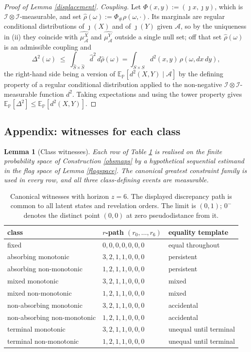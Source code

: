 \documentclass{article}
\newcommand{\E}{\mathbb{E}_{\mathbb{P}}}
\newcommand{\I}{\mathcal{I}}
\newcommand{\1}{\mathbbm{1}}
\newtheorem{lemma}{Lemma}
\begin{document}
\begin{proof}[Proof of Lemma \ref{displacement}]
\emph{Coupling.} Let $\Phi(x,y):=(\jmath x,\jmath y)$, which is $\I\otimes\I$-measurable, and set
$\hat\rho(\omega):=\Phi_{\#}\rho(\omega,\cdot)$. Its marginals are regular conditional distributions
of $\jmath(X)$ and of $\jmath(Y)$ given $\mathcal{A}$, so by the uniqueness in (ii) they coincide
with $\widehat{\mu^X_\mathcal{A}}$ and $\widehat{\mu^Y_\mathcal{A}}$ outside a single null set;
off that set $\hat\rho(\omega)$ is an admissible coupling and
\[
\Delta^2(\omega)\;\le\;\int_{\hat S\times\hat S}\hat d^2\,d\hat\rho(\omega)
=\int_{S\times S}d^2(x,y)\,\rho(\omega,dx\,dy),
\]
the right-hand side being a version of $\E[d^2(X,Y)\mid\mathcal{A}]$ by the defining property of a
regular conditional distribution applied to the non-negative $\I\otimes\I$-measurable function
$d^2$. Taking expectations and using the tower property gives $\E[\Delta^2]\le\E[d^2(X,Y)]$.
\end{proof}

\subsection*{Appendix: witnesses for each class}

\begin{lemma}[Class witnesses]
\label{witnesses}
Each row of Table \ref{tab:classes} is realised on the finite probability space of Construction
\ref{obsmaps} by a hypothetical sequential estimand in the flag space of Lemma \ref{flagspace}.
The canonical greatest constraint family is used in every row, and all three class-defining events
are measurable.
\end{lemma}

\begin{table}
\caption{Canonical witnesses with horizon $z=6$. The displayed discrepancy path is common to all
latent states and revelation orders. The limit is $(0,1)$; $0^-$ denotes the distinct point
$(0,0)$ at zero pseudodistance from it.}
\label{tab:classes}
\begin{tabular}{lll}
\hline
class & $r$-path $(r_0,\dots,r_6)$ & equality template\\
\hline
fixed & $0,0,0,0,0,0,0$ & equal throughout\\
absorbing monotonic & $3,2,1,1,0,0,0$ & persistent\\
absorbing non-monotonic & $1,2,1,1,0,0,0$ & persistent\\
mixed monotonic & $3,2,1,1,0,0,0$ & mixed\\
mixed non-monotonic & $1,2,1,1,0,0,0$ & mixed\\
non-absorbing monotonic & $3,2,1,1,0,0,0$ & accidental\\
non-absorbing non-monotonic & $1,2,1,1,0,0,0$ & accidental\\
terminal monotonic & $3,2,1,1,0,0,0$ & unequal until terminal\\
terminal non-monotonic & $1,2,1,1,0,0,0$ & unequal until terminal\\
\hline
\end{tabular}
\end{table}
\end{document}

